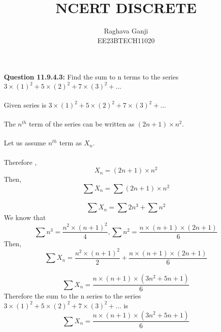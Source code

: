 \documentclass[joournal,12pt,twocolumn]{IEEEtran}
\title{NCERT DISCRETE}
\author{Raghava Ganji\\EE23BTECH11020}
\date{}
\begin{document}
\maketitle
\newpage
\bigskip
\textbf{Question 11.9.4.3:}
Find the sum to n terms to the series $3\times(1)^2+5\times(2)^2+7\times(3)^2+ \ldots$\\
\solution\\
Given series is $3\times(1)^2+5\times(2)^2+7\times(3)^2+ \ldots$\\\\
The $n^{th}$ term of the series can be written as $(2n+1)\times n^2$.\\\\
Let us assume $n^{th}$ term as $X_n$.\\\\
Therefore ,
\begin{equation}
X_n=(2n+1)\times n^2
\end{equation}
Then,
\begin{equation}
\sum X_n=\sum (2n+1)\times n^2
\end{equation}\\
\begin{equation}
\sum X_n=\sum 2n^3 +\sum n^2
\end{equation}
We know that 
\begin{equation}
\sum n^3=\frac{n^2\times(n+1)^2}{4}, \sum n^2=\frac{n\times(n+1)\times(2n+1)}{6}
\end{equation}
Then,
\begin{equation}
\sum X_n=\frac{n^2\times(n+1)^2}{2} +\frac{n\times(n+1)\times(2n+1)}{6}
\end{equation}\\
\begin{equation}
\sum X_n=\frac{n\times(n+1)\times(3n^2+5n+1)}{6}
\end{equation} 
Therefore the sum to the n series to the series $3\times(1)^2+5\times(2)^2+7\times(3)^2+\ldots$ is 
\begin{equation}
\sum X_n=\frac{n\times(n+1)\times(3n^2+5n+1)}{6}
\end{equation}
\end{document}
